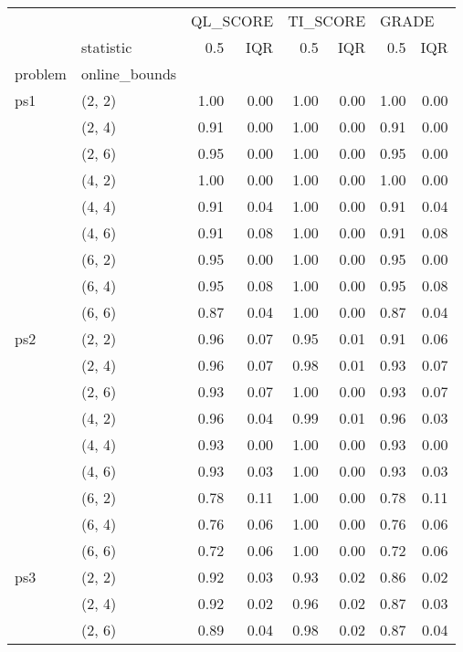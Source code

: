 \begin{tabular}{llrrrrrr}
\toprule
    & {} & \multicolumn{2}{l}{QL\_SCORE} & \multicolumn{2}{l}{TI\_SCORE} & \multicolumn{2}{l}{GRADE} \\
    & statistic &      0.5 &  IQR &      0.5 &  IQR &   0.5 &  IQR \\
problem & online\_bounds &          &      &          &      &       &      \\
\midrule
ps1 & (2, 2) &     1.00 & 0.00 &     1.00 & 0.00 &  1.00 & 0.00 \\
    & (2, 4) &     0.91 & 0.00 &     1.00 & 0.00 &  0.91 & 0.00 \\
    & (2, 6) &     0.95 & 0.00 &     1.00 & 0.00 &  0.95 & 0.00 \\
    & (4, 2) &     1.00 & 0.00 &     1.00 & 0.00 &  1.00 & 0.00 \\
    & (4, 4) &     0.91 & 0.04 &     1.00 & 0.00 &  0.91 & 0.04 \\
    & (4, 6) &     0.91 & 0.08 &     1.00 & 0.00 &  0.91 & 0.08 \\
    & (6, 2) &     0.95 & 0.00 &     1.00 & 0.00 &  0.95 & 0.00 \\
    & (6, 4) &     0.95 & 0.08 &     1.00 & 0.00 &  0.95 & 0.08 \\
    & (6, 6) &     0.87 & 0.04 &     1.00 & 0.00 &  0.87 & 0.04 \\
ps2 & (2, 2) &     0.96 & 0.07 &     0.95 & 0.01 &  0.91 & 0.06 \\
    & (2, 4) &     0.96 & 0.07 &     0.98 & 0.01 &  0.93 & 0.07 \\
    & (2, 6) &     0.93 & 0.07 &     1.00 & 0.00 &  0.93 & 0.07 \\
    & (4, 2) &     0.96 & 0.04 &     0.99 & 0.01 &  0.96 & 0.03 \\
    & (4, 4) &     0.93 & 0.00 &     1.00 & 0.00 &  0.93 & 0.00 \\
    & (4, 6) &     0.93 & 0.03 &     1.00 & 0.00 &  0.93 & 0.03 \\
    & (6, 2) &     0.78 & 0.11 &     1.00 & 0.00 &  0.78 & 0.11 \\
    & (6, 4) &     0.76 & 0.06 &     1.00 & 0.00 &  0.76 & 0.06 \\
    & (6, 6) &     0.72 & 0.06 &     1.00 & 0.00 &  0.72 & 0.06 \\
ps3 & (2, 2) &     0.92 & 0.03 &     0.93 & 0.02 &  0.86 & 0.02 \\
    & (2, 4) &     0.92 & 0.02 &     0.96 & 0.02 &  0.87 & 0.03 \\
    & (2, 6) &     0.89 & 0.04 &     0.98 & 0.02 &  0.87 & 0.04 \\

\end{tabular}
